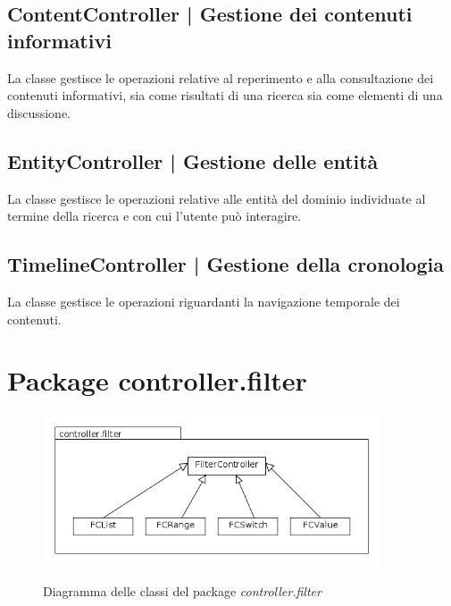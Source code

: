 \documentclass[10pt,a4paper,headinclude,footinclude,hidelinks]{scrreprt} %
\begin{document}
	\subsection[ContentController]{ContentController | Gestione dei contenuti informativi}
	\label{sec:stage:design:controller:content}
	La classe \textit{} gestisce le operazioni relative al reperimento e alla consultazione dei contenuti informativi, sia come risultati di una ricerca sia come elementi di una discussione.

	\subsection[EntityController]{EntityController | Gestione delle entità}
	\label{sec:stage:design:controller:entity}
	La classe \textit{} gestisce le operazioni relative alle entità del dominio individuate al termine della ricerca e con cui l'utente può interagire.

	\subsection[TimelineController]{TimelineController | Gestione della cronologia}
	\label{sec:stage:design:controller:timeline}
	La classe \textit{} gestisce le operazioni riguardanti la navigazione temporale dei contenuti.

	\section{Package controller.filter}
	\label{sec:stage:design:controller.filter}

	\begin{figure}[ht]
		\begin{center}
	    	\includegraphics[width=10cm]{class/controller_filter.png}
			\label{gfx:class:controller:filter}
			\caption{Diagramma delle classi del package \textit{controller.filter}}
		\end{center}
	\end{figure}
\end{document}
